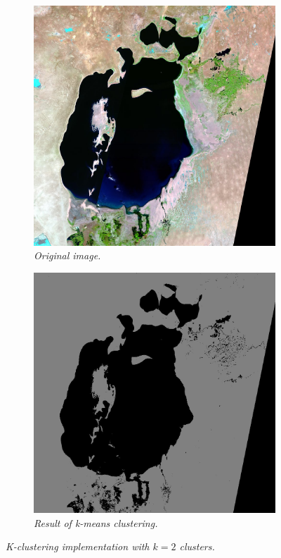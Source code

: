 \begin{figure}[H]
    \centering
    \begin{subfigure}[b]{.45\textwidth}
        \includegraphics[width=\textwidth]{../img/1987.jpg}
        \caption{\emph{Original image.}}
    \end{subfigure}
    \begin{subfigure}[b]{.45\textwidth}
        \includegraphics[width=\textwidth]{../img/2clusters.jpg}
        \caption{\emph{Result of k-means clustering.}}
    \end{subfigure}
    \caption{\emph{K-clustering implementation with $k=2$ clusters.}}
    \label{fig:plugin}
\end{figure}
